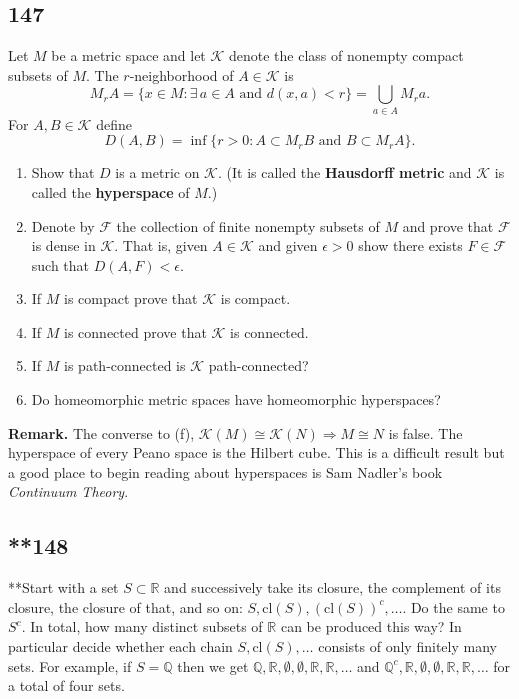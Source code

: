 \documentclass{amsart}
\begin{document}
\subsection*{147}
Let $M$ be a metric space and let $\mathcal{K}$ denote the class of nonempty compact subsets of $M$. The $r$-neighborhood of $A \in \mathcal{K}$ is
\[
M_r A = \{x \in M : \exists\, a \in A \text{ and } d(x,a) < r\} = \bigcup_{a \in A} M_r a.
\]
For $A, B \in \mathcal{K}$ define
\[
D(A,B) = \inf\{r>0 : A \subset M_r B \text{ and } B \subset M_r A\}.
\]
\begin{enumerate}[label=(\alph*)]
\item Show that $D$ is a metric on $\mathcal{K}$. (It is called the \textbf{Hausdorff metric} and $\mathcal{K}$ is called the \textbf{hyperspace} of $M$.)
\item Denote by $\mathcal{F}$ the collection of finite nonempty subsets of $M$ and prove that $\mathcal{F}$ is dense in $\mathcal{K}$. That is, given $A \in \mathcal{K}$ and given $\epsilon>0$ show there exists $F \in \mathcal{F}$ such that $D(A,F) < \epsilon$.
\item[*(c)] If $M$ is compact prove that $\mathcal{K}$ is compact.
\item If $M$ is connected prove that $\mathcal{K}$ is connected.
\item[**(e)] If $M$ is path-connected is $\mathcal{K}$ path-connected?
\item Do homeomorphic metric spaces have homeomorphic hyperspaces?
\end{enumerate}
\textbf{Remark.} The converse to (f), $\mathcal{K}(M) \cong \mathcal{K}(N) \Rightarrow M \cong N$ is false. The hyperspace of every Peano space is the Hilbert cube. This is a difficult result but a good place to begin reading about hyperspaces is Sam Nadler's book \emph{Continuum Theory}.

\subsection*{**148}
**Start with a set $S \subset \mathbb{R}$ and successively take its closure, the complement of its closure, the closure of that, and so on: $S, \mathrm{cl}(S), (\mathrm{cl}(S))^c, \ldots$. Do the same to $S^c$. In total, how many distinct subsets of $\mathbb{R}$ can be produced this way? In particular decide whether each chain $S, \mathrm{cl}(S), \ldots$ consists of only finitely many sets. For example, if $S = \mathbb{Q}$ then we get $\mathbb{Q}, \mathbb{R}, \emptyset, \emptyset, \mathbb{R}, \mathbb{R}, \ldots$ and $\mathbb{Q}^c, \mathbb{R}, \emptyset, \emptyset, \mathbb{R}, \mathbb{R}, \ldots$ for a total of four sets.
\end{document}
